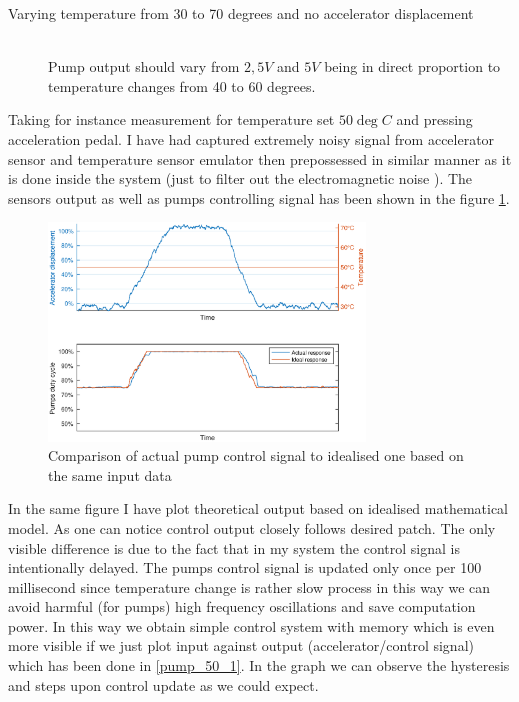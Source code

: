 \begin{description}
    \item[Varying temperature from 30 to 70 degrees and no accelerator displacement] \hfill \\ Pump output should vary from $2,5V$ and $5V$ being in direct proportion to temperature changes from 40 to 60 degrees.
\end{description}

Taking for instance measurement for temperature set $50\deg C$ and pressing acceleration pedal. I have had captured extremely noisy signal from accelerator sensor and temperature sensor emulator then prepossessed in similar manner as it is done inside the system (just to filter out the electromagnetic noise ). The sensors output as well as pumps controlling signal has been shown in the figure \ref{pump_50}.

\begin{figure}[h]
    \centering
    \includegraphics[height=5.8cm]{figures/pump_50.eps}
    \caption[Temperature set to 50\textdegree C and varying accelerator displacement]{Comparison of actual pump control signal to idealised one based on the same input data}
    \label{pump_50}
\end{figure}

In the same figure I have plot theoretical output based on idealised mathematical model. As one can notice control output closely follows desired patch. The only visible difference is due to the fact that in my system the control signal is intentionally delayed.
The pumps control signal is updated only once per 100 millisecond since temperature change is rather slow process in this way we can avoid harmful (for pumps) high frequency oscillations and save computation power. In this way we obtain simple control system with memory which is even more visible if we just plot input against output (accelerator/control signal) which has been done in \ref{pump_50_1}. In the graph we can observe the hysteresis and steps upon control update as we could expect.


